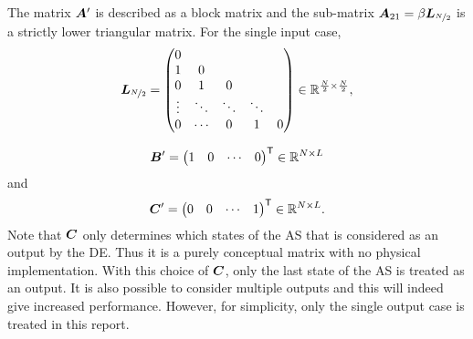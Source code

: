 The matrix $\bm{A}'$ is described as a block matrix and the sub-matrix $\bm{A}_{21} = \beta \bm{L}_{\nicefrac{N}{2}}$ is a strictly lower triangular matrix. For the single input case,
\begin{equation}
    \label{eq:def_Lmat}
    \bm{L}_{\nicefrac{N}{2}} =
    \begin{pmatrix}
        0 \\
        1 & 0 & \\
        0 & 1 & 0 \\
        \vdots & \ddots & \ddots & \ddots \\
        0 & \cdots & 0 & 1 & 0
    \end{pmatrix}
    \in \mathbb{R}^{\frac{N}{2} \times \frac{N}{2}},
\end{equation}

\begin{equation}
    \bm{B}' =
    \begin{pmatrix}
        1 & 0 & \cdots & 0
    \end{pmatrix}^\mathsf{T}
    \in \mathbb{R}^{N \times L}
\end{equation}
and
\begin{equation}
    \bm{C}' =
    \begin{pmatrix}
        0 & 0 & \cdots & 1
    \end{pmatrix}^\mathsf{T}
    \in \mathbb{R}^{N \times L}.
\end{equation}
Note that $\bm{C}$ only determines which states of the AS that is considered as an output by the DE. Thus it is a purely conceptual matrix with no physical implementation. With this choice of $\bm{C}$, only the last state of the AS is treated as an output. It is also possible to consider multiple outputs and this will indeed give increased performance. However, for simplicity, only the single output case is treated in this report.

